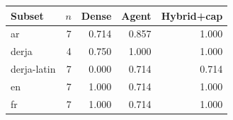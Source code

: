 \begin{tabular}{@{}lrrrr@{}}
\toprule
Subset & $n$ & Dense & Agent & Hybrid+cap \\
\midrule
ar & 7 & 0.714 & 0.857 & 1.000 \\
derja & 4 & 0.750 & 1.000 & 1.000 \\
derja-latin & 7 & 0.000 & 0.714 & 0.714 \\
en & 7 & 1.000 & 0.714 & 1.000 \\
fr & 7 & 1.000 & 0.714 & 1.000 \\
\bottomrule
\end{tabular}